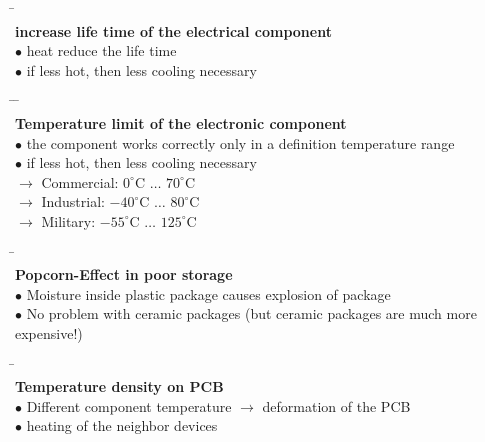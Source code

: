 \begin{tabbing}
	\hspace{10mm} \= \hspace{5mm} \= \\
	\textbf{increase life time of the electrical component}	 \hfill \\
						\>$\bullet$ \>heat reduce the life time \\
						\>$\bullet$ \>if less hot, then less cooling necessary
\end{tabbing}

\begin{tabbing}
	\hspace{10mm} \= \hspace{5mm} \= \hspace{30mm} \=\\
	\textbf{Temperature limit of the electronic component}	 \hfill \\
						\>$\bullet$ \>the component works correctly only in a definition temperature range \\
						\>$\bullet$ \>if less hot, then less cooling necessary \\
							     \> \>$\rightarrow$ Commercial: \> $0^\circ\text{C}$ $\ldots$ $70^\circ\text{C}$ \\
							     \> \>$\rightarrow$ Industrial: \> $-40^\circ\text{C}$ $\ldots$ $80^\circ\text{C}$\\
							     \> \>$\rightarrow$ Military:   \> $-55^\circ\text{C}$ $\ldots$ $125^\circ\text{C}$ \\
\end{tabbing}

\begin{tabbing}
	\hspace{10mm} \= \hspace{5mm} \= \\
	\textbf{Popcorn-Effect in poor storage}	 \hfill \\
						\>$\bullet$ \>Moisture inside plastic package causes explosion of package \\
						\>$\bullet$ \>No problem with ceramic packages (but ceramic packages are much more expensive!)
\end{tabbing}

\begin{tabbing}
	\hspace{10mm} \= \hspace{5mm} \= \\
	\textbf{Temperature density on PCB}	 \hfill \\
						\>$\bullet$ \>Different component temperature $\rightarrow$ deformation of the PCB \\
						\>$\bullet$ \>heating of the neighbor devices
\end{tabbing}
	

